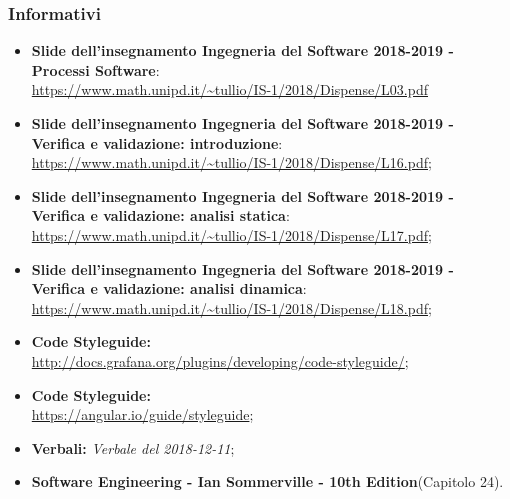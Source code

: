 \subsubsection{Informativi}
\begin{itemize}
	\item \textbf{Slide dell'insegnamento Ingegneria del Software 2018-2019 - Processi Software}: \\
	\url{https://www.math.unipd.it/~tullio/IS-1/2018/Dispense/L03.pdf}
	\item \textbf{Slide dell'insegnamento Ingegneria del Software 2018-2019 - Verifica e validazione: introduzione}: \\
	\url{https://www.math.unipd.it/~tullio/IS-1/2018/Dispense/L16.pdf};
	\item \textbf{Slide dell'insegnamento Ingegneria del Software 2018-2019 - Verifica e validazione: analisi statica}: \\
	\url{https://www.math.unipd.it/~tullio/IS-1/2018/Dispense/L17.pdf};
	\item \textbf{Slide dell'insegnamento Ingegneria del Software 2018-2019 - Verifica e validazione: analisi dinamica}: \\
	\url{https://www.math.unipd.it/~tullio/IS-1/2018/Dispense/L18.pdf};
	\item \textbf{ Code Styleguide:} \\
	\url{http://docs.grafana.org/plugins/developing/code-styleguide/};
	\item \textbf{ Code Styleguide:} \\
	\url{https://angular.io/guide/styleguide};
	\item \textbf{Verbali:} \emph{Verbale del 2018-12-11};
	\item \textbf{Software Engineering - Ian Sommerville - 10th Edition}(Capitolo 24).
\end{itemize}
\pagebreak
